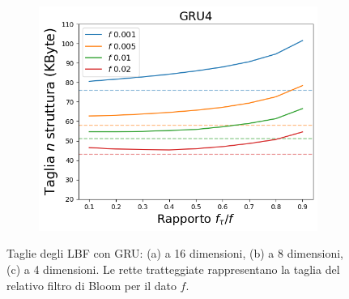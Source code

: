 \documentclass[../../main.tex]{subfiles}
\begin{document}
\begin{figure}[H]
\begin{subfigure}[b]{0.49\textwidth}
            \caption{}
            \label{fig:LBFTagliaGRU8}
        \end{subfigure}
        \begin{subfigure}[b]{0.49\textwidth}
            \centering
            \includegraphics[width = \textwidth]{immagini/7/LBF/GRU4_Taglia.png}
            \caption{}
            \label{fig:LBFTagliaGRU4}
        \end{subfigure}
        \caption{Taglie degli LBF con GRU: (a) a 16 dimensioni, (b) a 8 dimensioni, (c) a 4 dimensioni. Le rette tratteggiate rappresentano la taglia del relativo filtro di Bloom per il dato $f$.}
        \label{fig:taglieGRULBF}
    \end{figure}
\end{document}
